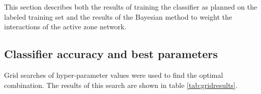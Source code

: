 This section describes both the results of training the classifier as planned on the labeled training set and the results of the Bayesian method to weight the interactions of the active zone network.

\subsection{Classifier accuracy and best parameters}
\label{gridresults}

Grid searches of hyper-parameter values were used to find the optimal combination.
The results of this search are shown in table \ref{tab:gridresults}.

